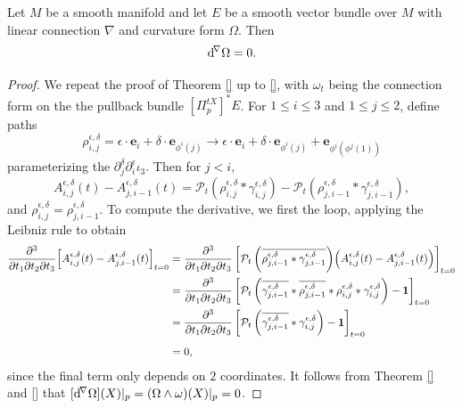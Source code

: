 \begin{theorem}
Let $M$ be a smooth manifold and let $E$ be a smooth vector bundle over $M$ with linear connection $\nabla$ and curvature form $\Omega$. Then
\begin{equation}
  \mathrm{d}^{\mskip -3mu \nabla} \Omega = 0.
\end{equation}
\end{theorem}
\begin{proof}
We repeat the proof of Theorem \ref{} up to \eqref{}, with $\omega_t$ being the connection form on the the pullback bundle $[\Pi_p^{tX}]^* E$. For $1 \leq i \leq 3$ and $1 \leq j \leq 2$, define paths
\begin{equation}
  \rho_{i, j}^{\epsilon, \delta} = \epsilon \cdot \mathbf{e}_i + \delta \cdot \mathbf{e}_{\phi^i(j)} \to  \epsilon \cdot \mathbf{e}_i + \delta \cdot \mathbf{e}_{\phi^i(j)} + \mathbf{e}_{\phi^i(\phi^j(1))}
\end{equation}
parameterizing the  $\partial_j^\delta \partial_i^\epsilon \iota_3$. Then for $j < i$,
\begin{equation}
  A_{i, j}^{\epsilon, \delta}(t) - A_{j, i-1}^{\epsilon, \delta}(t)  = \mathcal{P}_t(\rho_{i, j}^{\epsilon, \delta} \ast \gamma_{i,j}^{\epsilon, \delta}) - \mathcal{P}_t(\rho_{j, i-1}^{\epsilon, \delta} \ast \gamma_{j, i-1}^{\epsilon, \delta}),
\end{equation}
and $\rho_{i, j}^{\epsilon, \delta} = \rho_{j, i-1}^{\epsilon, \delta}$. To compute the derivative, we first  the loop, applying the Leibniz rule to obtain
\begin{align}
  \frac{\partial^3}{\partial t_1 \partial t_2 \partial t_3} \Big[ A_{i, j}^{\epsilon, \delta}(t) - A_{j, i-1}^{\epsilon, \delta}(t)\Big]_{t = 0} &= \frac{\partial^3}{\partial t_1 \partial t_2 \partial t_3} \left[\mathcal{P}_t\left(\rule{0pt}{14pt}\overline{\rule{0pt}{10pt}\smash{\rho_{j, i-1}^{\epsilon, \delta} \ast \gamma_{j,i - 1}^{\epsilon, \delta}}}\right) \!\Big( A_{i, j}^{\epsilon, \delta}(t) - A_{j, i-1}^{\epsilon, \delta}(t)\Big)\right]_{t = 0} \nonumber \\
  &= \frac{\partial^3}{\partial t_1 \partial t_2 \partial t_3} \left[ 
  \mathcal{P}_t\left(\rule{0pt}{14pt}\overline{\rule{0pt}{10pt}\smash{\gamma_{j,i - 1}^{\epsilon, \delta}}} \ast \overline{\rule{0pt}{10pt}\smash{\rho_{j, i-1}^{\epsilon, \delta}}} \ast \rho_{i, j}^{\epsilon, \delta} \ast \gamma_{i,j}^{\epsilon, \delta}\right)  - \mathbf{1}\right]_{t = 0} \nonumber \\
  &= \frac{\partial^3}{\partial t_1 \partial t_2 \partial t_3} \left[ 
  \mathcal{P}_t\left(\rule{0pt}{14pt}\overline{\rule{0pt}{10pt}\smash{\gamma_{j,i - 1}^{\epsilon, \delta}}} \ast \gamma_{i,j}^{\epsilon, \delta}\right)  - \mathbf{1}\right]_{t = 0} \nonumber \\[1ex]
  &= 0,
\end{align}
since the final term only depends on $2$ coordinates. It follows from Theorem \ref{} and \eqref{} that $[\mathrm{d}^{\mskip -3mu \nabla}\Omega](X)|_p = (\Omega \wedge \omega)(X)|_p = 0$.
\end{proof}


